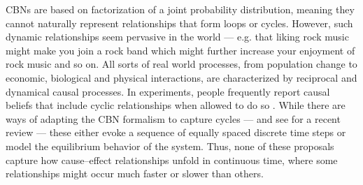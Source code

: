 \documentclass{cambridge7A}%
\begin{document}



CBNs are based on factorization of a joint probability distribution, meaning they cannot naturally represent relationships that form loops or cycles.  However, such dynamic relationships seem pervasive in the world --- e.g. that liking rock music might make you join a rock band which  might further increase your enjoyment of rock music and so on.  All sorts of real world processes, from population change \citep{malthus1888essay} to economic, biological and physical interactions, are characterized by reciprocal and dynamical causal processes.  In experiments, people frequently report causal beliefs that include cyclic relationships when allowed to do so \citep{nikolic2015there,kim2002clinical,sloman1998feature}.
While there are ways of adapting the CBN formalism to capture cycles --- \citep[e.g.][]{dean1989model,lauritzen2002chain} and see \cite{rehder2016cycles} for a recent review --- these either evoke a sequence of equally spaced discrete time steps or model the equilibrium behavior of the system.  Thus, none of these proposals capture how cause--effect relationships unfold in continuous time, where some relationships might occur much faster or slower than others.%
\end{document}
